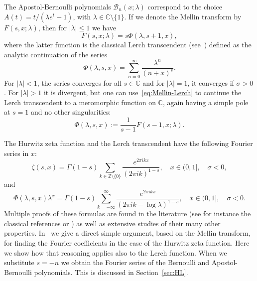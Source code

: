 \documentclass[11pt,a4paper]{amsart}
\newcommand{\Z}{\mathbb{Z}}
\newcommand{\C}{\mathbb{C}}
\newcommand{\AB}{\mathcal{B}}
\theoremstyle{plain}
\theoremstyle{plain}
\theoremstyle{plain}
\theoremstyle{remark}
\begin{document}
The Apostol-Bernoulli polynomials $\AB_n(x;\lambda)$ correspond to the choice $A(t)=t/(\lambda e^t-1)$, with $\lambda\in\C\setminus\{1\}$. If we denote the Mellin transform by $F(s,x;\lambda)$, then for $|\lambda|\leq 1$ we have
\begin{equation}
\label{eq:Mellin-Lerch}
  F(s,x;\lambda) = s \Phi(\lambda,s+1,x),
\end{equation}
where the latter function is the classical Lerch transcendent (see~\cite{Ap}) defined as the analytic continuation of the series
%
\begin{equation*}
  \Phi(\lambda,s,x) = \sum_{n=0}^\infty \frac{\lambda^n}{(n + x)^{s}}.
\end{equation*}
%
For $|\lambda|<1$, the series converges for all $s \in \C$ and for $|\lambda|=1$, it converges if $\sigma>0$. For $|\lambda|>1$ it is divergent, but one can use~\eqref{eq:Mellin-Lerch} to continue the Lerch transcendent to a meromorphic function on $\C$, again having a simple pole at $s=1$ and no other singularities:
%
\begin{equation}
\label{eq:Mellin-Lerch-ext}
  \Phi(\lambda,s,x) := \frac{1}{s-1}F(s-1,x;\lambda).
\end{equation}

The Hurwitz zeta function and the Lerch transcendent have the following Fourier series in $x$:
\begin{equation*}
  \zeta(s,x) = \Gamma(1-s)\sum_{k\in\Z \setminus \{0\}}\frac{e^{2\pi ikx}}{(2\pi i k)^{1-s}},
\quad x\in (0,1], \quad \sigma<0,
\end{equation*}
and
\begin{equation*}
\Phi(\lambda,s,x)\lambda^x = \Gamma(1-s) \sum_{k=-\infty}^\infty \frac{e^{2\pi ikx}}{(2\pi i k -\log\lambda)^{1-s}},
\quad x\in (0,1], \quad \sigma<0.
\end{equation*}
Multiple proofs of these formulas are found in the literature (see for instance the classical references \cite[\S\,1.10 and \S\,1.11]{Bate} or \cite[\S\,1.6]{MOS})
as well as extensive studies of their many other properties. In~\cite{NRV-Lerch-Fou} we give a direct simple argument, based on the Mellin transform, for finding the Fourier coefficients in the case of the Hurwitz zeta function. Here we show how that reasoning applies also to the Lerch function. When we substitute $s = -n$ we obtain the Fourier series of the Bernoulli and Apostol-Bernoulli polynomials. This is discussed in Section~\ref{sec:HL}.
\end{document}
